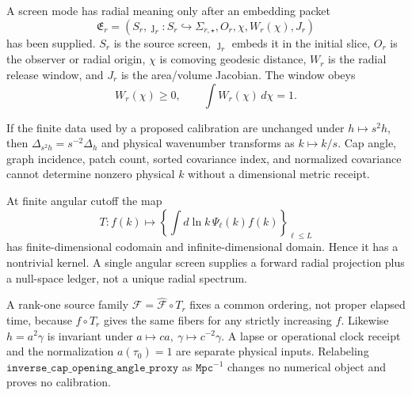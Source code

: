 \begin{definition}\label{def:source-screen-embedding-packet}
A screen mode has radial meaning only after an embedding packet
\[
\mathfrak E_r=
\left(
S_r,\jmath_r:S_r\hookrightarrow\Sigma_{r,\star},O_r,\chi,W_r(\chi),J_r
\right)
\]
has been supplied.  \(S_r\) is the source screen, \(\jmath_r\) embeds it in the initial slice,
\(O_r\) is the observer or radial origin, \(\chi\) is comoving geodesic distance, \(W_r\) is the
radial release window, and \(J_r\) is the area/volume Jacobian.  The window obeys
\[
W_r(\chi)\ge0,\qquad \int W_r(\chi)\,d\chi=1.
\]
\end{definition}

\begin{proposition}\label{prop:scale-bridge-rescaling-nogo}
If the finite data used by a proposed calibration are unchanged under \(h\mapsto s^2h\), then
\(\Delta_{s^2h}=s^{-2}\Delta_h\) and physical wavenumber transforms as \(k\mapsto k/s\).
Cap angle, graph incidence, patch count, sorted covariance index, and normalized covariance cannot
determine nonzero physical \(k\) without a dimensional metric receipt.
\end{proposition}

\begin{proposition}\label{prop:angular-radial-nogo}
At finite angular cutoff the map
\[
T:f(k)\mapsto\left\{\int d\ln k\,\Psi_\ell(k)f(k)\right\}_{\ell\le L}
\]
has finite-dimensional codomain and infinite-dimensional domain.  Hence it has a nontrivial kernel.
A single angular screen supplies a forward radial projection plus a null-space ledger, not a unique
radial spectrum.
\end{proposition}

\begin{proposition}\label{prop:clock-scale-nogo}
A rank-one source family \(\mathcal F=\widehat{\mathcal F}\circ T_r\) fixes a common ordering, not
proper elapsed time, because \(f\circ T_r\) gives the same fibers for any strictly increasing
\(f\).  Likewise \(h=a^2\gamma\) is invariant under
\(a\mapsto ca,\ \gamma\mapsto c^{-2}\gamma\).  A lapse or operational clock receipt and the
normalization \(a(\tau_0)=1\) are separate physical inputs.  Relabeling
\(\texttt{inverse\_cap\_opening\_angle\_proxy}\) as \(\texttt{Mpc}^{-1}\) changes no numerical
object and proves no calibration.
\end{proposition}

